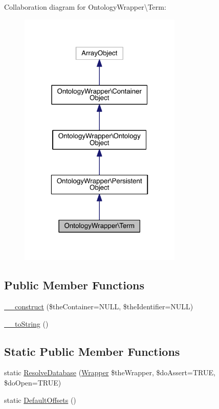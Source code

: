 Collaboration diagram for Ontology\-Wrapper\textbackslash{}Term\-:
\nopagebreak
\begin{figure}[H]
\begin{center}
\leavevmode
\includegraphics[width=220pt]{class_ontology_wrapper_1_1_term__coll__graph}
\end{center}
\end{figure}
\subsection*{Public Member Functions}
\begin{DoxyCompactItemize}
\item 
\hyperlink{class_ontology_wrapper_1_1_term_af15064bcbdb083627b156deb9bce7aea}{\-\_\-\-\_\-construct} (\$the\-Container=N\-U\-L\-L, \$the\-Identifier=N\-U\-L\-L)
\item 
\hyperlink{class_ontology_wrapper_1_1_term_aa7383f85b2674552dee20cb726dbec7d}{\-\_\-\-\_\-to\-String} ()
\end{DoxyCompactItemize}
\subsection*{Static Public Member Functions}
\begin{DoxyCompactItemize}
\item 
static \hyperlink{class_ontology_wrapper_1_1_term_ac86b4a7bfbc21bd19cdadc9e8b0de865}{Resolve\-Database} (\hyperlink{class_ontology_wrapper_1_1_wrapper}{Wrapper} \$the\-Wrapper, \$do\-Assert=T\-R\-U\-E, \$do\-Open=T\-R\-U\-E)
\item 
static \hyperlink{class_ontology_wrapper_1_1_term_a46659ba47e1850dc102baa812a4c4d52}{Default\-Offsets} ()
\end{DoxyCompactItemize}
